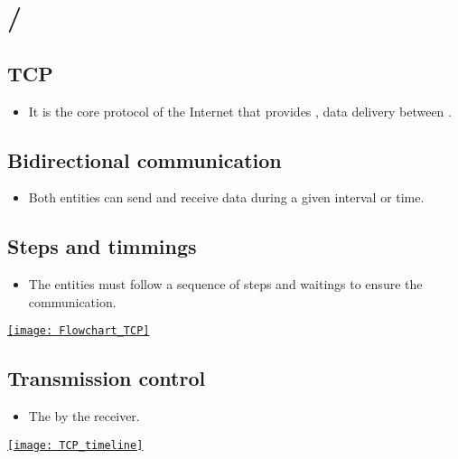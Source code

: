 \chapter{/}

\section{\gls{TCP}}
\begin{itemize}
\item It is the core protocol of the Internet that provides
  , data delivery between
  .
\end{itemize}

\section{Bidirectional communication}
\begin{itemize}
\item Both entities can send and receive data during a given interval or time.
\end{itemize}

\section{Steps and timmings}
\begin{itemize} 
\item The entities must follow a sequence of steps and waitings to ensure the communication.
\end{itemize}
\vspace{-2ex}
\begin{center}
  \href{https://www.ibm.com/support/pages/flowchart-tcp-connections-and-their-definition}{\texttt{[image: Flowchart\_TCP]}}
\end{center}

\section{Transmission control}
\begin{itemize} 
\item The  by the receiver.
\end{itemize}
\vspace{-2ex}
\begin{center}
  \href{https://ieeexplore.ieee.org/document/8668433}{\texttt{[image: TCP\_timeline]}}
\end{center}

